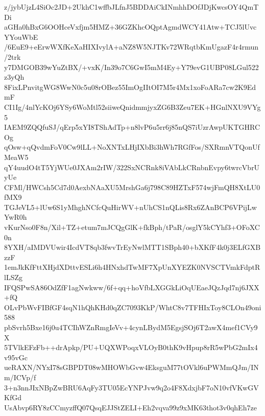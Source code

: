 z/jybUjzL4SiOc2JD+2UkhC1wffbJLfnJ5BDDAiCkINmhhDOfJDjKwcsOY4QmTDi
aGHa0hBxG6OOHceVxfjm5HMZ+36GZKhcOQptAgmdWCY41Atw+TCJ5lUvcYYouWbE
/6EuE9+eErwWXfKeXaHIXIvylA+aNZ8W5NJTKv72WRqtbKmUgazF4r4rmun/2trk
y7DMGOB39wYuZtBX/+vxK/In39o7C6GwI5mM4Ey+Y79evG1UBP08LGul522z3yQh
8FixLPnvitgWG8WwN0c5u08rOBez55ImOgIItOI7M5r4Mx1xoFoARa7cw2K9EdmF
CI1Ig/4nlYcKOj6YSy6WoMtl52siiweQnidmmjyxZG6B3Zeu7EK+HGnlNXU9VYg5
IAEM9ZQQfuSJ/qErp5xYI8TShAdTp+n8lvP6u5rr6j85nQS7iUzrAwpUKTGHRCOg
qOsw+qQvdmFoV0Cw9lLL+NoXNTxLHjIXbBi3hWh7RGfFos/SXRmnVTQonUfMeaW5
qY4uudO4tT5YjWUe0JXAm2rIW/322SxNCRnk8iVAbLkCRnbnEvpy6twrcVbrUyUe
CFMl/HWCsh5Cd7d0AexbNAaXU5MrshGa6j798C89HZTxF574wjFmQH8XtLU0fMX9
TGJeVL5+lUw6S1yMhghNCfcQuHirWV+nUhCS1nQLis8Rx6ZAnBCP6VPijLwYwR0h
vKurNso0F8n/Xil+TZ+etum7mJCQgGlK+fkBph/tPaR/osglY5kCYhf3+OFoXC0n
8YXH/aIMDVUwir4IcdVT8qb3fwvTrEyNwlMTT1SBph40+bXKfF4k0j3ELfGXBzzF
1emJkKfFttXHjdXDttvESLi6h4HNxhdTwMF7XpUnXYEZK0NVSCTVmkFdptRlLSZg
IFQSPwSA86OdZfF1agNwkww/6f+qq+hoVfbLXGGkLiOqUEaeJQzJqd7nj6JXX+fQ
OLvPbWvFIBfGF4sqN1hQhKHd0qZC7093KkP/WhtC8v7TFHIxToy8CLOn49oni588
pbSvrh5Bxe16j0u4TCIhWZnRmgIeVv+4cynLBydM5EgsjSOj6T2awX4mef1CVy9X
5TVlkEFzFb++drApkp/PU+UQXWPoqxVLOyB0thK9vHpup8rR5wPbG2mIx4v95vGc
ueRAXN/NYxI78sGBPDT08wMHOWbGvw4EksguM77tOVkl6uPWMmQJm/INm/ICVp/f
3+n3nnJIxNBpZwBRU6AqFy3TU05EcYNPJvw9q2o4F8XdxjbF7oN10vfVKwGVKfGd
UsAbvp6RY8zCCmyzffQ07QsqEJJStZELI+Eh2vqva99z9xMK63thot3v0qhEh7ze
